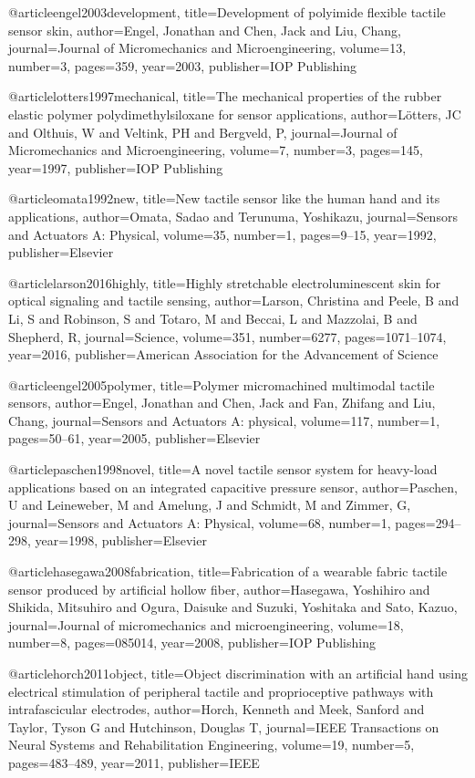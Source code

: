 @article{engel2003development,
  title={Development of polyimide flexible tactile sensor skin},
  author={Engel, Jonathan and Chen, Jack and Liu, Chang},
  journal={Journal of Micromechanics and Microengineering},
  volume={13},
  number={3},
  pages={359},
  year={2003},
  publisher={IOP Publishing}
}

@article{lotters1997mechanical,
  title={The mechanical properties of the rubber elastic polymer polydimethylsiloxane for sensor applications},
  author={L{\"o}tters, JC and Olthuis, W and Veltink, PH and Bergveld, P},
  journal={Journal of Micromechanics and Microengineering},
  volume={7},
  number={3},
  pages={145},
  year={1997},
  publisher={IOP Publishing}
}

@article{omata1992new,
  title={New tactile sensor like the human hand and its applications},
  author={Omata, Sadao and Terunuma, Yoshikazu},
  journal={Sensors and Actuators A: Physical},
  volume={35},
  number={1},
  pages={9--15},
  year={1992},
  publisher={Elsevier}
}

@article{larson2016highly,
  title={Highly stretchable electroluminescent skin for optical signaling and tactile sensing},
  author={Larson, Christina and Peele, B and Li, S and Robinson, S and Totaro, M and Beccai, L and Mazzolai, B and Shepherd, R},
  journal={Science},
  volume={351},
  number={6277},
  pages={1071--1074},
  year={2016},
  publisher={American Association for the Advancement of Science}
}

@article{engel2005polymer,
  title={Polymer micromachined multimodal tactile sensors},
  author={Engel, Jonathan and Chen, Jack and Fan, Zhifang and Liu, Chang},
  journal={Sensors and Actuators A: physical},
  volume={117},
  number={1},
  pages={50--61},
  year={2005},
  publisher={Elsevier}
}

@article{paschen1998novel,
  title={A novel tactile sensor system for heavy-load applications based on an integrated capacitive pressure sensor},
  author={Paschen, U and Leineweber, M and Amelung, J and Schmidt, M and Zimmer, G},
  journal={Sensors and Actuators A: Physical},
  volume={68},
  number={1},
  pages={294--298},
  year={1998},
  publisher={Elsevier}
}

@article{hasegawa2008fabrication,
  title={Fabrication of a wearable fabric tactile sensor produced by artificial hollow fiber},
  author={Hasegawa, Yoshihiro and Shikida, Mitsuhiro and Ogura, Daisuke and Suzuki, Yoshitaka and Sato, Kazuo},
  journal={Journal of micromechanics and microengineering},
  volume={18},
  number={8},
  pages={085014},
  year={2008},
  publisher={IOP Publishing}
}

@article{horch2011object,
  title={Object discrimination with an artificial hand using electrical stimulation of peripheral tactile and proprioceptive pathways with intrafascicular electrodes},
  author={Horch, Kenneth and Meek, Sanford and Taylor, Tyson G and Hutchinson, Douglas T},
  journal={IEEE Transactions on Neural Systems and Rehabilitation Engineering},
  volume={19},
  number={5},
  pages={483--489},
  year={2011},
  publisher={IEEE}
}

